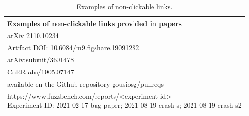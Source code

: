 \documentclass{article}
\begin{document}

\setcounter{table}{10}%

\begin{table}[htbp]
    \caption{Examples of non-clickable links.}
    \label{tab:non-clickable-links}
    \centering
    \small
    \begin{tabular}{m{120mm}}
        \toprule
        Examples of non-clickable links provided in papers \\
        \midrule

\rowcolor{gray!10}
        arXiv 2110.10234 \\

        Artifact DOI: 10.6084/m9.figshare.19091282 \\

\rowcolor{gray!10}
        arXiv:submit/3601478 \\

        CoRR abs/1905.07147 \\

\rowcolor{gray!10}
        available on the Github repository gousiosg/pullreqs \\

        \makecell[l]{https://www.fuzzbench.com/reports/<experiment-id>\\
        Experiment ID: 2021-02-17-bug-paper; 2021-08-19-crash-s; 2021-08-19-crash-s2}\\
        \bottomrule
    \end{tabular}
\end{table}
\end{document}
